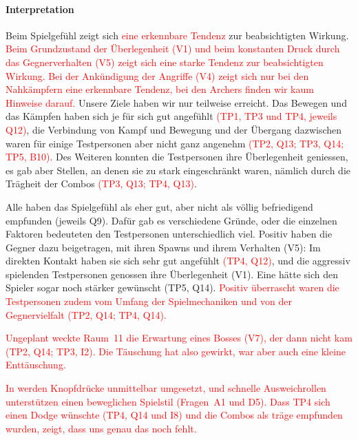 \documentclass[../Main.tex]{subfiles}
\begin{document}
\paragraph{Interpretation}
Beim Spielgefühl zeigt sich \textcolor{red}{eine erkennbare Tendenz} zur beabsichtigten Wirkung. \textcolor{red}{Beim Grundzustand der Überlegenheit (V1) und beim konstanten Druck durch das Gegnerverhalten (V5) zeigt sich eine starke Tendenz zur beabsichtigten Wirkung. Bei der Ankündigung der Angriffe (V4) zeigt sich nur bei den Nahkämpfern \textcolor{red}{eine erkennbare Tendenz}, bei den Archers finden wir kaum Hinweise darauf.} Unsere Ziele haben wir nur teilweise erreicht. Das Bewegen und das Kämpfen haben sich je für sich gut angefühlt \textcolor{red}{(TP1, TP3 und TP4, jeweils Q12)}, die Verbindung von Kampf und Bewegung und der Übergang dazwischen waren für einige Testpersonen aber nicht ganz angenehm \textcolor{red}{(TP2, Q13; TP3, Q14; TP5, B10)}. Des Weiteren konnten die Testpersonen ihre Überlegenheit geniessen, es gab aber Stellen, an denen sie zu stark eingeschränkt waren, nämlich durch die Trägheit der Combos \textcolor{red}{(TP3, Q13; TP4, Q13)}.

Alle haben das Spielgefühl als eher gut, aber nicht als völlig befriedigend empfunden (jeweils Q9). Dafür gab es verschiedene Gründe, oder die einzelnen Faktoren bedeuteten den Testpersonen unterschiedlich viel. Positiv haben die Gegner dazu beigetragen, mit ihren Spawns und ihrem Verhalten (V5): Im direkten Kontakt haben sie sich sehr gut angefühlt \textcolor{red}{(TP4, Q12)}, und die aggressiv spielenden Testpersonen genossen ihre Überlegenheit (V1). Eine hätte sich den Spieler sogar noch stärker gewünscht (TP5, Q14). \textcolor{red}{Positiv überrascht waren die Testpersonen zudem vom Umfang der Spielmechaniken und von der Gegnervielfalt (TP2, Q14; TP4, Q14).}

\textcolor{red}{Ungeplant weckte Raum~11 die Erwartung eines Bosses (V7), der dann nicht kam (TP2, Q14; TP3, I2). Die Täuschung hat also gewirkt, war aber auch eine kleine Enttäuschung.}

\textcolor{red}{In  werden Knopfdrücke unmittelbar umgesetzt, und schnelle Ausweichrollen unterstützen einen beweglichen Spielstil (Fragen~A1 und D5). Dass TP4 sich einen Dodge wünschte (TP4, Q14 und I8) und die Combos als träge empfunden wurden, zeigt, dass uns genau das noch fehlt.}
\end{document}
